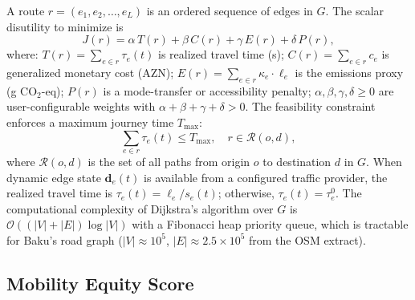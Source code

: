 A route $r = (e_1, e_2, \ldots, e_L)$ is an ordered sequence of edges
in $G$.
The scalar disutility to minimize is
\begin{equation}
  J(r) = \alpha\, T(r) + \beta\, C(r) + \gamma\, E(r) + \delta\, P(r),
  \label{eq:routing}
\end{equation}
where:
$T(r) = \sum_{e \in r} \tau_e(t)$ is realized travel time (s);
$C(r) = \sum_{e \in r} c_e$ is generalized monetary cost (AZN);
$E(r) = \sum_{e \in r} \kappa_e \cdot \ell_e$ is the emissions proxy
(g CO$_2$-eq); $P(r)$ is a mode-transfer or accessibility penalty;
$\alpha, \beta, \gamma, \delta \geq 0$ are user-configurable weights with
$\alpha + \beta + \gamma + \delta > 0$.
The feasibility constraint enforces a maximum journey time $T_{\max}$:
\begin{equation}
  \sum_{e \in r} \tau_e(t) \leq T_{\max},
  \quad r \in \mathcal{R}(o, d),
  \label{eq:routing_constraint}
\end{equation}
where $\mathcal{R}(o,d)$ is the set of all paths from origin $o$ to
destination $d$ in $G$.
When dynamic edge state $\mathbf{d}_e(t)$ is available from a configured
traffic provider, the realized travel time is
$\tau_e(t) = \ell_e / s_e(t)$; otherwise,
$\tau_e(t) = \tau_e^0$.
The computational complexity of Dijkstra's algorithm over $G$ is
$\mathcal{O}((|V|+|E|)\log|V|)$ with a Fibonacci heap priority queue,
which is tractable for Baku's road graph ($|V| \approx 10^5$,
$|E| \approx 2.5 \times 10^5$ from the OSM extract).

\subsection{Mobility Equity Score}

